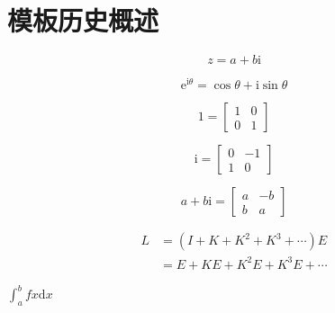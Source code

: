 \section{模板历史概述}

$$
    z = a + b \mathrm{i}
$$

$$
    \mathrm{e}^{\mathrm{i}\theta} = \cos \theta + \mathrm{i} \sin \theta
$$

$$
    1 = \begin{bmatrix}
        1 & 0 \\
        0 & 1
    \end{bmatrix}
$$

$$
    \mathrm{i} =
    \begin{bmatrix}
        0 & -1 \\
        1 & 0
    \end{bmatrix}
$$

$$
    a + b \mathrm{i} =
    \begin{bmatrix}
        a & -b \\
        b & a
    \end{bmatrix}
$$


\begin{align*}
    L & = (I + K + K^2 + K^3 + \cdots)E  \\
      & = E + KE + K^2 E + K^3E + \cdots
\end{align*}

$\int_a^b f{x} \mathrm{d} x$

